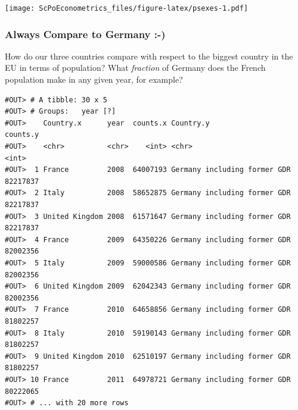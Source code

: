 \documentclass[]{book}
\newenvironment{Shaded}{\begin{snugshade}}{\end{snugshade}}
\newcommand{\KeywordTok}[1]{\textcolor[rgb]{0.13,0.29,0.53}{\textbf{#1}}}
\newcommand{\DataTypeTok}[1]{\textcolor[rgb]{0.13,0.29,0.53}{#1}}
\newcommand{\StringTok}[1]{\textcolor[rgb]{0.31,0.60,0.02}{#1}}
\newcommand{\CommentTok}[1]{\textcolor[rgb]{0.56,0.35,0.01}{\textit{#1}}}
\newcommand{\OperatorTok}[1]{\textcolor[rgb]{0.81,0.36,0.00}{\textbf{#1}}}
\newcommand{\NormalTok}[1]{#1}
\theoremstyle{definition}
\theoremstyle{definition}
\theoremstyle{definition}
\theoremstyle{remark}
\begin{document}
\texttt{[image: ScPoEconometrics\_files/figure-latex/psexes-1.pdf]}

\subsubsection*{Always Compare to Germany
:-)}\label{always-compare-to-germany--}

How do our three countries compare with respect to the biggest country
in the EU in terms of population? What \emph{fraction} of Germany does
the French population make in any given year, for example?

\begin{Shaded}
\end{Shaded}

\begin{verbatim}
#OUT> # A tibble: 30 x 5
#OUT> # Groups:   year [?]
#OUT>    Country.x      year  counts.x Country.y                    counts.y
#OUT>    <chr>          <chr>    <int> <chr>                           <int>
#OUT>  1 France         2008  64007193 Germany including former GDR 82217837
#OUT>  2 Italy          2008  58652875 Germany including former GDR 82217837
#OUT>  3 United Kingdom 2008  61571647 Germany including former GDR 82217837
#OUT>  4 France         2009  64350226 Germany including former GDR 82002356
#OUT>  5 Italy          2009  59000586 Germany including former GDR 82002356
#OUT>  6 United Kingdom 2009  62042343 Germany including former GDR 82002356
#OUT>  7 France         2010  64658856 Germany including former GDR 81802257
#OUT>  8 Italy          2010  59190143 Germany including former GDR 81802257
#OUT>  9 United Kingdom 2010  62510197 Germany including former GDR 81802257
#OUT> 10 France         2011  64978721 Germany including former GDR 80222065
#OUT> # ... with 20 more rows
\end{verbatim}
\end{document}

